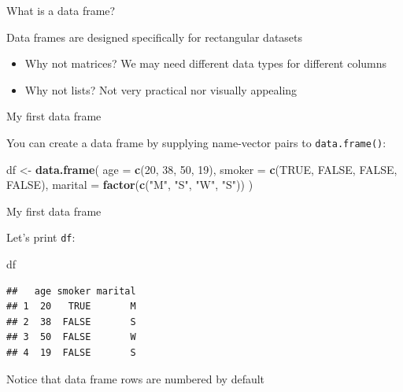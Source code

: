 \documentclass[ignorenonframetext,]{beamer}
\newenvironment{Shaded}{\begin{snugshade}}{\end{snugshade}}
\newcommand{\DataTypeTok}[1]{\textcolor[rgb]{0.13,0.29,0.53}{#1}}
\newcommand{\DecValTok}[1]{\textcolor[rgb]{0.00,0.00,0.81}{#1}}
\newcommand{\KeywordTok}[1]{\textcolor[rgb]{0.13,0.29,0.53}{\textbf{#1}}}
\newcommand{\NormalTok}[1]{#1}
\newcommand{\OtherTok}[1]{\textcolor[rgb]{0.56,0.35,0.01}{#1}}
\newcommand{\StringTok}[1]{\textcolor[rgb]{0.31,0.60,0.02}{#1}}
\begin{document}
\begin{frame}{What is a data frame?}
\protect\hypertarget{what-is-a-data-frame}{}

Data frames are designed specifically for rectangular datasets

\begin{itemize}
\item
  Why not matrices? We may need different data types for different
  columns
\item
  Why not lists? Not very practical nor visually appealing
\end{itemize}

\end{frame}

\begin{frame}[fragile]{My first data frame}
\protect\hypertarget{my-first-data-frame}{}

You can create a data frame by supplying name-vector pairs to
\texttt{data.frame()}:

\begin{Shaded}
\begin{Highlighting}[]
\NormalTok{df <-}\StringTok{ }\KeywordTok{data.frame}\NormalTok{(}
  \DataTypeTok{age =} \KeywordTok{c}\NormalTok{(}\DecValTok{20}\NormalTok{, }\DecValTok{38}\NormalTok{, }\DecValTok{50}\NormalTok{, }\DecValTok{19}\NormalTok{),}
  \DataTypeTok{smoker =} \KeywordTok{c}\NormalTok{(}\OtherTok{TRUE}\NormalTok{, }\OtherTok{FALSE}\NormalTok{, }\OtherTok{FALSE}\NormalTok{, }\OtherTok{FALSE}\NormalTok{),}
  \DataTypeTok{marital =} \KeywordTok{factor}\NormalTok{(}\KeywordTok{c}\NormalTok{(}\StringTok{"M"}\NormalTok{, }\StringTok{"S"}\NormalTok{, }\StringTok{"W"}\NormalTok{, }\StringTok{"S"}\NormalTok{))}
\NormalTok{)}
\end{Highlighting}
\end{Shaded}

\end{frame}

\begin{frame}[fragile]{My first data frame}
\protect\hypertarget{my-first-data-frame-1}{}

Let's print \texttt{df}:

\begin{Shaded}
\begin{Highlighting}[]
\NormalTok{df}
\end{Highlighting}
\end{Shaded}

\begin{verbatim}
##   age smoker marital
## 1  20   TRUE       M
## 2  38  FALSE       S
## 3  50  FALSE       W
## 4  19  FALSE       S
\end{verbatim}

Notice that data frame rows are numbered by default

\end{frame}
\end{document}
